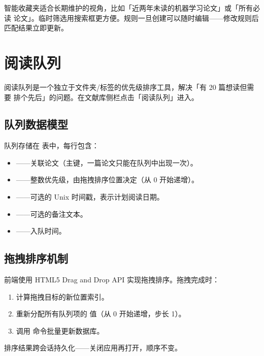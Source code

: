 \begin{tipbox}
智能收藏夹适合长期维护的视角，比如「近两年未读的机器学习论文」或「所有必读
论文」。临时筛选用搜索框更方便。规则一旦创建可以随时编辑——修改规则后
匹配结果立即更新。
\end{tipbox}

\section{阅读队列}

阅读队列是一个独立于文件夹/标签的优先级排序工具，解决「有 20 篇想读但需要
排个先后」的问题。在文献库侧栏点击「阅读队列」进入。


\subsection{队列数据模型}

队列存储在  表中，每行包含：

\begin{itemize}
  \item {}——关联论文（主键，一篇论文只能在队列中出现一次）。
  \item {}——整数优先级，由拖拽排序位置决定（从 0 开始递增）。
  \item {}——可选的 Unix 时间戳，表示计划阅读日期。
  \item {}——可选的备注文本。
  \item {}——入队时间。
\end{itemize}

\subsection{拖拽排序机制}

前端使用 HTML5 Drag and Drop API 实现拖拽排序。拖拽完成时：

\begin{enumerate}
  \item 计算拖拽目标的新位置索引。
  \item 重新分配所有队列项的  值（从 0 开始递增，步长 1）。
  \item 调用  命令批量更新数据库。
\end{enumerate}

排序结果跨会话持久化——关闭应用再打开，顺序不变。

